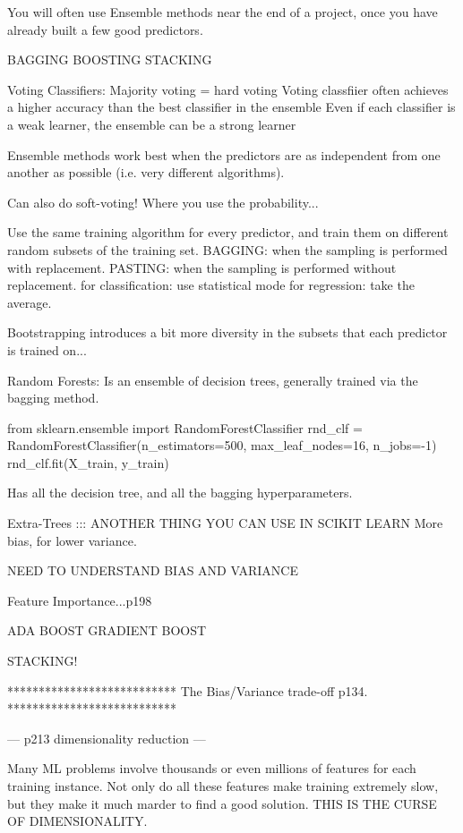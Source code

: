 You will often use Ensemble methods near the end of a project,
once you have already built a few good predictors.

BAGGING
BOOSTING
STACKING

Voting Classifiers:
Majority voting = hard voting
Voting classfiier often achieves a higher accuracy than the best classifier in the ensemble
Even if each classifier is a weak learner,
the ensemble can be a strong learner

Ensemble methods work best when the predictors are
as independent from one another as possible (i.e. very different algorithms).

Can also do soft-voting! Where you use the probability...


Use the same training algorithm for every predictor,
and train them on different random subsets of the training set.
BAGGING: when the sampling is performed with replacement.
PASTING: when the sampling is performed without replacement.
for classification: use statistical mode
for regression: take the average.

Bootstrapping introduces a bit more diversity in the subsets that each predictor is trained on...

Random Forests:
Is an ensemble of decision trees, generally trained via the bagging method.

from sklearn.ensemble import RandomForestClassifier
rnd_clf = RandomForestClassifier(n_estimators=500, max_leaf_nodes=16, n_jobs=-1)
rnd_clf.fit(X_train, y_train)

Has all the decision tree, and all the bagging hyperparameters.

Extra-Trees ::: ANOTHER THING YOU CAN USE IN SCIKIT LEARN
More bias, for lower variance.

NEED TO UNDERSTAND BIAS AND VARIANCE

Feature Importance...p198

ADA BOOST
GRADIENT BOOST

STACKING!





***************************
The Bias/Variance trade-off
p134.
***************************




---
p213 dimensionality reduction
---

Many ML problems involve thousands or even millions of features for each training instance.
Not only do all these features make training extremely slow,
but they make it much marder to find a good solution.
THIS IS THE CURSE OF DIMENSIONALITY.

